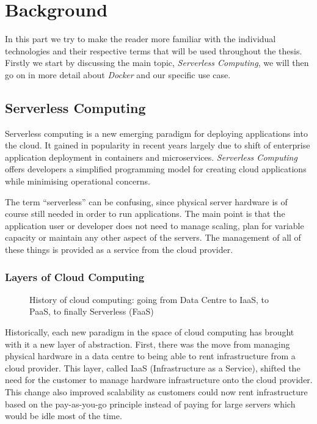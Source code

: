 \section{Background}

In this part we try to make the reader more familiar with the individual technologies and their
respective terms that will be used throughout the thesis. Firstly we start by discussing the main
topic, \textit{Serverless Computing}, we will then go on in more detail about \textit{Docker} and
our specific use case.

\subsection{Serverless Computing}

Serverless computing is a new emerging paradigm for deploying applications into the cloud. It gained
in popularity in recent years largely due to shift of enterprise application deployment in
containers and microservices. \textit{Serverless Computing} offers developers a simplified
programming model for creating cloud applications while minimising operational concerns.
\cite{servprog}

The term “serverless” can be confusing, since physical server hardware is of course still needed in
order to run applications. The main point is that the application user or developer does not need to
manage scaling, plan for variable capacity or maintain any other aspect of the servers. The
management of all of these things is provided as a service from the cloud provider.
\cite{wikiservcomp}

\subsubsection{Layers of Cloud Computing}

\begin{figure}[H]
  \centering
  \caption{History of cloud computing: going from Data Centre to IaaS, to PaaS, to finally
  Serverless (FaaS) \cite{layercloudcomp}}
\end{figure}

Historically, each new paradigm in the space of cloud computing has brought with it a new layer of
abstraction. First, there was the move from managing physical hardware in a data centre to being
able to rent infrastructure from a cloud provider. This layer, called IaaS (Infrastructure as a
Service), shifted the need for the customer to manage hardware infrastructure onto the cloud
provider. This change also improved scalability as customers could now rent infrastructure based on
the pay-as-you-go principle instead of paying for large servers which would be idle most of the
time.

